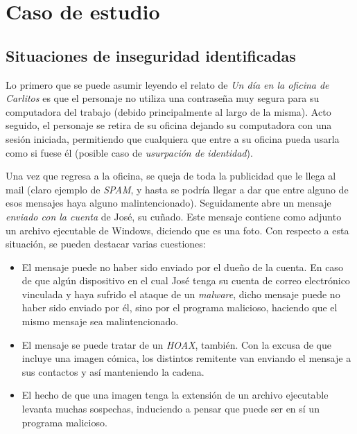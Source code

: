 







\clearpage
\tableofcontents
\clearpage 

\lstset{style=cstyle}


\section{Caso de estudio}

\subsection{Situaciones de inseguridad identificadas}

Lo primero que se puede asumir leyendo el relato de \emph{Un día en la oficina de Carlitos} es que el personaje no utiliza una contraseña muy segura para su computadora del trabajo (debido principalmente al largo de la misma). Acto seguido, el personaje se retira de su oficina dejando su computadora con una sesión iniciada, permitiendo que cualquiera que entre a su oficina pueda usarla como si fuese él (posible caso de \emph{usurpación de identidad}).

Una vez que regresa a la oficina, se queja de toda la publicidad que le llega al mail (claro ejemplo de \emph{SPAM}, y hasta se podría llegar a dar que entre alguno de esos mensajes haya alguno malintencionado). Seguidamente abre un mensaje \emph{enviado con la cuenta} de José, su cuñado. Este mensaje contiene como adjunto un archivo ejecutable de Windows, diciendo que es una foto. Con respecto a esta situación, se pueden destacar varias cuestiones:

\begin{itemize}
    \item El mensaje puede no haber sido enviado por el dueño de la cuenta. En caso de que algún dispositivo en el cual José tenga su cuenta de correo electrónico vinculada y haya sufrido el ataque de un \emph{malware}, dicho mensaje puede no haber sido enviado por él, sino por el programa malicioso, haciendo que el mismo mensaje sea malintencionado.
    \item El mensaje se puede tratar de un \emph{HOAX}, también. Con la excusa de que incluye una imagen cómica, los distintos remitente van enviando el mensaje a sus contactos y así manteniendo la cadena. 
    \item El hecho de que una imagen tenga la extensión de un archivo ejecutable levanta muchas sospechas, induciendo a pensar que puede ser en sí un programa malicioso.
\end{itemize}

